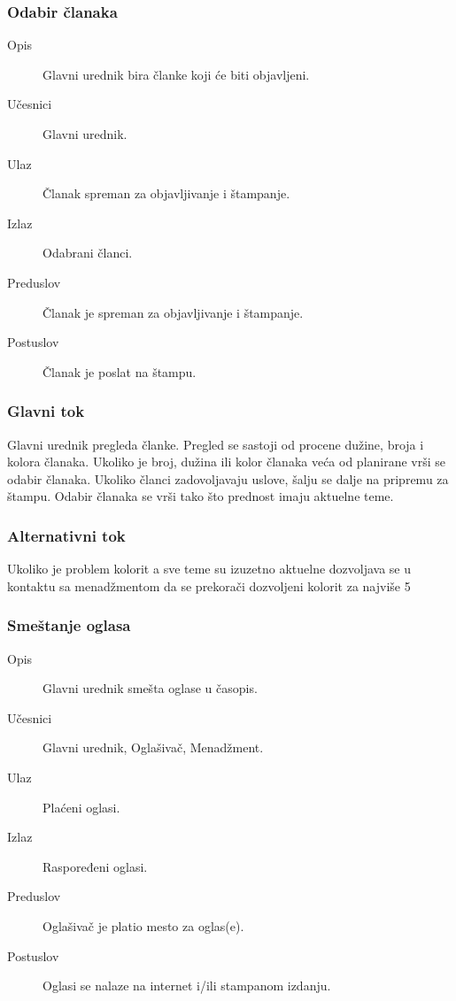 \subsubsection{Odabir članaka}
\begin{description}
\item [Opis] Glavni urednik bira članke koji će biti objavljeni.
\item [Učesnici] Glavni urednik.
\item [Ulaz] Članak spreman za objavljivanje i štampanje.
\item [Izlaz] Odabrani članci.
\item [Preduslov] Članak je spreman za objavljivanje i štampanje.
\item [Postuslov] Članak je poslat na štampu.
\end{description}   
\subsubsection{Glavni tok}
Glavni urednik pregleda članke. Pregled se sastoji od procene dužine, broja i kolora članaka. Ukoliko je broj, dužina ili kolor članaka veća od planirane vrši se odabir članaka. Ukoliko članci zadovoljavaju uslove, šalju se dalje na pripremu za štampu. Odabir članaka se vrši tako što prednost imaju aktuelne teme. 
\subsubsection{Alternativni tok}
Ukoliko je problem kolorit a sve teme su izuzetno aktuelne dozvoljava se u kontaktu sa menadžmentom da se prekorači dozvoljeni kolorit za najviše 5%

\subsubsection{Smeštanje oglasa}
\begin{description}
\item [Opis] Glavni urednik smešta oglase u časopis.
\item [Učesnici] Glavni urednik, Oglašivač, Menadžment.
\item [Ulaz] Plaćeni oglasi.
\item [Izlaz] Raspoređeni oglasi.
\item [Preduslov] Oglašivač je platio mesto za oglas(e).
\item [Postuslov] Oglasi se nalaze na internet i/ili stampanom izdanju.
\end{description}   
